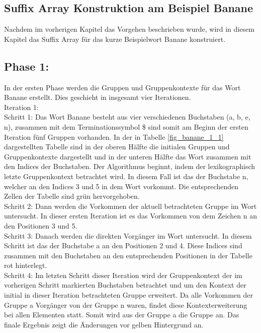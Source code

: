 \newpage
\subsection{Suffix Array Konstruktion am Beispiel Banane}
\label{gsaca:chapter3}
%
Nachdem im vorherigen Kapitel das Vorgehen beschrieben wurde, wird in diesem Kapitel das Suffix Array für das kurze Beispielwort Banane konstruiert.

\subsection*{Phase 1:}
In der ersten Phase werden die Gruppen und Gruppenkontexte für das Wort Banane erstellt. 
Dies geschieht in insgesamt vier Iterationen.\\

Iteration 1:\\
Schritt 1: Das Wort Banane besteht aus vier verschiedenen Buchstaben (a, b, e, n), zusammen mit dem Terminationssymbol \$ sind somit am Beginn der ersten Iteration fünf Gruppen vorhanden. 
In der in Tabelle \ref{fig_banane_1_1} dargestellten Tabelle sind in der oberen Hälfte die initialen Gruppen und Gruppenkontexte dargestellt und in der unteren Hälfte das Wort zusammen mit den Indices der Buchstaben. 
Der Algorithmus beginnt, indem der lexikographisch letzte Gruppenkontext betrachtet wird. 
In diesem Fall ist das der Buchstabe n, welcher an den Indices 3 und 5 in dem Wort vorkommt. 
Die entsprechenden Zellen der Tabelle sind grün hervorgehoben. \\
Schritt 2: Dann werden die Vorkommen der aktuell betrachteten Gruppe im Wort untersucht. 
In dieser ersten Iteration ist es das Vorkommen von dem Zei\-chen n an den Positionen 3 und 5. \\
Schritt 3: Danach werden die direkten Vorgänger im Wort untersucht. 
In diesem Schritt ist das der Buchstabe a an den Positionen 2 und 4. 
Diese Indices sind zusammen mit den Buchstaben an den entsprechenden Positionen in der Tabelle rot hinterlegt. \\
Schritt 4: Im letzten Schritt dieser Iteration wird der Gruppenkontext der im vorherigen Schritt markierten Buchstaben betrachtet und um den Kontext der initial in dieser Iteration betrachteten Gruppe erweitert. 
Da alle Vorkommen der Gruppe a Vorgänger von der Gruppe n waren, findet diese Kontexterweiterung bei allen Elementen statt. 
Somit wird aus der Gruppe a die Gruppe an. Das finale Ergebnis zeigt die Änderungen vor gelben Hintergrund an.\\


